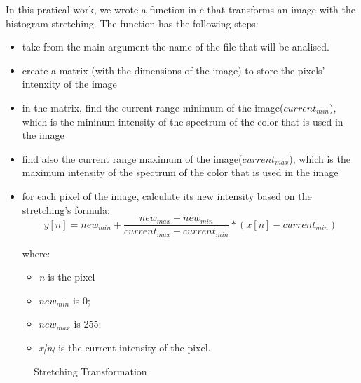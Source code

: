 \documentclass{article}
\begin{document}
	In this pratical work, we wrote a function in c that transforms an image with the histogram stretching. The function has the following steps:
	\begin{itemize}
  		\item take from the main argument the name of the file that will be analised.
  		\item create a matrix (with the dimensions of the image) to store the pixels' intenxity of the image
  		\item in the matrix, find the current range minimum of the image({\it $current_{min}$}), which is the mininum intensity of the spectrum of the color 			that is used in the image
  		\item find also the current range maximum of the image({\it $current_{max}$}), which is the maximum intensity of the spectrum of the color that is 			used in the image
  		\item for each pixel of the image, calculate its new intensity based on the stretching's formula:
		\begin{equation}
			y[n]=new_{min}+\frac{new_{max}-new_{min}}{current_{max}-current_{min}}*(x[n]-current_{min})
			\label{eq:stretching}
		\end{equation}
	
		where: 
			\begin{itemize}
	  			\item {\it n} is the pixel		
	  			\item {\it $new_{min}$} is 0;
	  			\item {\it $new_{max}$} is 255; 
	  			\item {\it x[n]} is the current intensity of the pixel.
			\end{itemize}
	\end{itemize}

	\begin{figure}[H]
	\centering
	\caption{Stretching Transformation}
	\label{fig:stretching}
	\end{figure}
\end{document}
